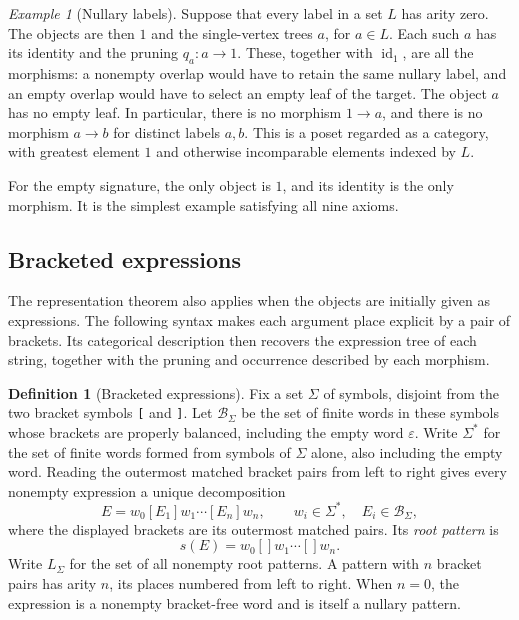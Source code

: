 \documentclass[11pt,a4paper]{article}
\theoremstyle{plain}
\theoremstyle{definition}
\newtheorem{definition}[theorem]{Definition}
\theoremstyle{remark}
\newtheorem{example}[theorem]{Example}
\newcommand{\id}{\operatorname{id}}
\begin{document}
\begin{example}[Nullary labels]
Suppose that every label in a set $L$ has arity zero. The objects are
then $1$ and the single-vertex trees $a$, for $a\in L$. Each such
$a$ has its identity and the pruning $q_a:a\to1$. These, together
with $\id_1$, are all the morphisms: a nonempty overlap would have
to retain the same nullary label, and an empty overlap would have
to select an empty leaf of the target. The object $a$ has no empty
leaf. In particular, there is no morphism $1\to a$, and there is
no morphism $a\to b$ for distinct labels $a,b$. This is a poset
regarded as a category, with greatest element $1$ and otherwise
incomparable elements indexed by $L$.

For the empty signature, the only object is $1$, and its identity
is the only morphism. It is the simplest example satisfying all
nine axioms.
\end{example}

\subsection{Bracketed expressions}\label{sec:bracketed}
The representation theorem also applies when the objects are
initially given as expressions. The following syntax makes each
argument place explicit by a pair of brackets. Its categorical
description then recovers the expression tree of each string,
together with the pruning and occurrence described by each morphism.

\begin{definition}[Bracketed expressions]\label{def:bracketed}
Fix a set $\Sigma$ of symbols, disjoint from the two bracket symbols
\texttt{[} and \texttt{]}. Let $\mathcal B_\Sigma$ be the set of finite
words in these symbols whose brackets are properly balanced, including the empty
word $\varepsilon$. Write $\Sigma^*$ for the set of finite words
formed from symbols of $\Sigma$ alone, also including the empty word.
Reading the outermost matched bracket pairs from left to right gives
every nonempty expression a unique decomposition
\begin{equation}\label{eq:bracket-decomposition}
E=w_0[E_1]w_1\cdots[E_n]w_n,
 \qquad w_i\in\Sigma^*,\quad E_i\in\mathcal B_\Sigma,
\end{equation}
where the displayed brackets are its outermost matched pairs.
Its \emph{root pattern} is
\[
s(E)=w_0[]w_1\cdots[]w_n.
\]
Write $L_\Sigma$ for the set of all nonempty root patterns. A pattern
with $n$ bracket pairs has arity $n$, its places numbered from left
to right. When $n=0$, the expression is a nonempty bracket-free word
and is itself a nullary pattern.
\end{definition}
\end{document}
